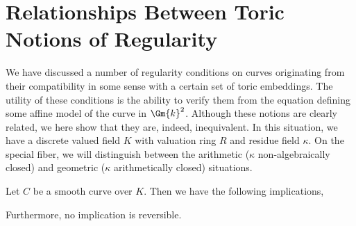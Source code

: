 \section{Relationships Between Toric Notions of Regularity}

We have discussed a number of regularity conditions on curves originating from their compatibility in some sense with a certain set of toric embeddings. The utility of these conditions is the ability to verify them from the equation defining some affine model of the curve in $\Gm{k}^2$. Although these notions are clearly related, we here show that they are, indeed, inequivalent. In this situation, we have a discrete valued field $K$ with valuation ring $R$ and residue field $\kappa$. On the special fiber, we will distinguish between the arithmetic ($\kappa$ non-algebraically closed) and geometric ($\kappa$ arithmetically closed) situations. 

\begin{prop}
Let $C$ be a smooth curve over $K$. Then we have the following implications,
\begin{center}
\end{center}
Furthermore, no implication is reversible. 
\end{prop}


